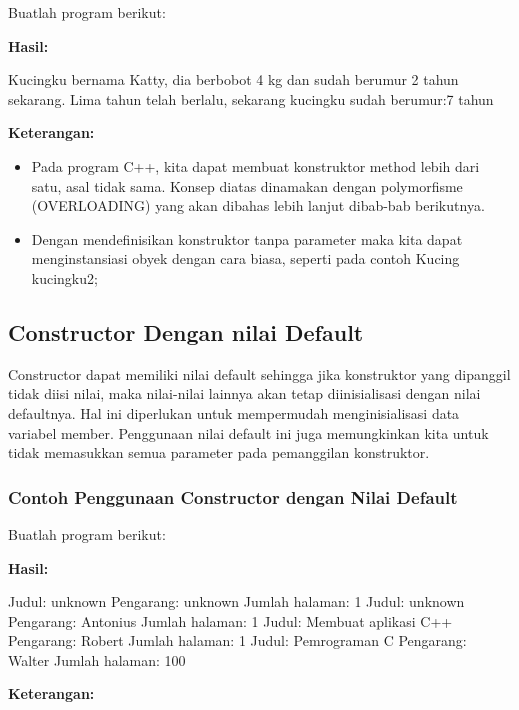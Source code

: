 Buatlah program berikut:



\textbf{Hasil:}

\begin{lcverbatim}
Kucingku bernama Katty, dia berbobot 4 kg dan
sudah berumur 2 tahun sekarang.
Lima tahun telah berlalu, sekarang kucingku
sudah berumur:7 tahun
\end{lcverbatim}

\textbf{Keterangan:}

\begin{itemize}

\item
 Pada program C++, kita dapat membuat konstruktor method lebih dari
 satu, asal tidak sama. Konsep diatas dinamakan dengan polymorfisme
 (OVERLOADING) yang akan dibahas lebih lanjut dibab-bab berikutnya.
\item
 Dengan mendefinisikan konstruktor tanpa parameter maka kita dapat
 menginstansiasi obyek dengan cara biasa, seperti pada contoh Kucing
 kucingku2;
\end{itemize}

\subsection{Constructor Dengan nilai
Default}\label{constructor-dengan-nilai-default}

Constructor dapat memiliki nilai default sehingga jika konstruktor yang
dipanggil tidak diisi nilai, maka nilai-nilai lainnya akan tetap
diinisialisasi dengan nilai defaultnya. Hal ini diperlukan untuk
mempermudah menginisialisasi data variabel member. Penggunaan nilai
default ini juga memungkinkan kita untuk tidak memasukkan semua
parameter pada pemanggilan konstruktor.

\subsubsection*{Contoh Penggunaan Constructor dengan Nilai Default}

Buatlah program berikut:



\textbf{Hasil:}

\begin{lcverbatim}
Judul: unknown
Pengarang: unknown
Jumlah halaman: 1
Judul: unknown
Pengarang: Antonius
Jumlah halaman: 1
Judul: Membuat aplikasi C++
Pengarang: Robert
Jumlah halaman: 1
Judul: Pemrograman C
Pengarang: Walter
Jumlah halaman: 100
\end{lcverbatim}
\textbf{Keterangan:}

